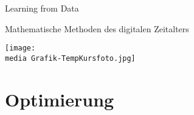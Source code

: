 \documentclass{newlayout}
\newcommand{\media}{../../media/}
\begin{document}
 \setcounter{page}{3}

\setcounter{tocdepth}{1}
 \tableofcontents

   \setcounter{secnumdepth}{1}


\setcounter{page}{7}
\setcounter{chapter}{0}




\begin{coursetitle}
  \centerline{Learning from Data} 
  \bigskip
  \Large \centerline{Mathematische Methoden des digitalen Zeitalters}
  \bigskip
 \texttt{[image: \\media Grafik-TempKursfoto.jpg]}
 \label{fig:meinbild}
  \bigskip
\end{coursetitle}


\section{Optimierung}

%

%

%
%

%
\end{document}
